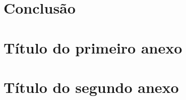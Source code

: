\documentclass[12pt,a4paper,header]{abnt}
\begin{document}
% 
% 

\chapter{Conclusão}

% 





\anexo



\chapter{Título do primeiro anexo}




\chapter{Título do segundo anexo}

\end{document}
